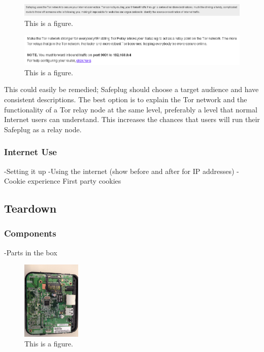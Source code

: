 \begin{figure}[htb]
\begin{center}
\includegraphics[width=\textwidth]{funnydesc.png}
\caption{This is a figure.}
\label{fig:funnydesc}
\end{center}
\end{figure}

\begin{figure}[htb]
\begin{center}
\includegraphics[width=\textwidth]{relaydesc.png}
\caption{This is a figure.}
\label{fig:relaydesc}
\end{center}
\end{figure}

This could easily be remedied; Safeplug should choose a target audience and have consistent descriptions.  The best option is to explain the Tor network and the functionality of a Tor relay node at the same level, preferably a level that normal Internet users can understand.  This increases the chances that users will run their Safeplug as a relay node.

\subsubsection{Internet Use}
    -Setting it up
    -Using the internet (show before and after for IP addresses)
    -Cookie experience First party cookies

\subsection{Teardown}
\label{sec:tear}

\subsubsection{Components}
    -Parts in the box

\begin{figure}[htb]
\begin{center}
\includegraphics[width=0.25\textwidth]{safeplug_top}
\caption{This is a figure.}
\end{center}
\end{figure}

